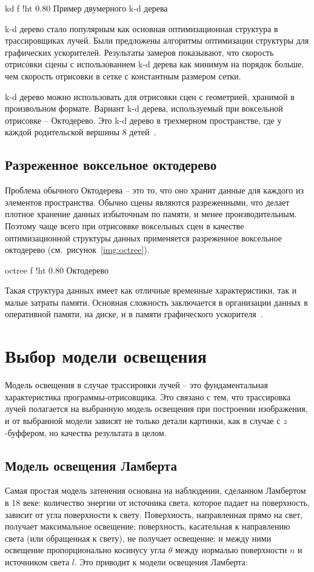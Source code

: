     {kd}
    {f}
    {!ht}
    {0.80\textwidth}
    {Пример двумерного k-d дерева}

k-d дерево стало популярным как основная оптимизационная структура в 
трассировщиках лучей. Были предложены алгоритмы оптимизации структуры для графических
ускорителей. Результаты замеров показывают, что скорость отрисовки сцены с использованием
k-d дерева как минимум на порядок больше, чем скорость отрисовки в сетке с константным 
размером сетки.

k-d дерево можно использовать для отрисовки сцен с геометрией, хранимой в произвольном 
формате. Вариант k-d дерева, используемый при воксельной отрисовке -- Октодерево. Это k-d дерево в трехмерном пространстве, где у каждой родительской вершины 8 детей~\cite{KDTASfaGR}.

\subsection{Разреженное воксельное октодерево}

Проблема обычного Октодерева -- это то, что оно хранит данные для каждого из элементов 
пространства. Обычно сцены являются разреженными, что делает плотное хранение данных
избыточным по памяти, и менее производительным. Поэтому чаще всего при отрисоввке
воксельных сцен в качестве оптимизационной структуры данных применяется разреженное воксельное
октодерево (см.~рисунок~\ref{img:octree}).

    {octree}
    {f}
    {!ht}
    {0.80\textwidth}
    {Октодерево}

Такая структура данных имеет как отличные временные характеристики, так и малые затраты памяти.
Основная сложность заключается в организации данных в оперативной памяти, на диске, 
и в памяти графического ускорителя~\cite{ESVOAEaI}.

\section{Выбор модели освещения}

Модель освещения в случае трассировки лучей -- это фундаментальная характеристика программы-отрисовщика. Это связано с тем, что трассировка лучей полагается на выбранную модель освещения
при построении изображения, и от выбранной модели зависят не только детали картинки, как в случае с $z$-буффером, но качества результата в целом.

\subsection{Модель освещения Ламберта}
Самая простая модель затенения основана на наблюдении, сделанном Ламбертом в 18 веке: 
количество энергии от источника света, которое падает на поверхность, зависит от угла 
поверхности к свету. Поверхность, направленная прямо на свет, получает максимальное 
освещение; поверхность, касательная к направлению света (или обращенная к свету), 
не получает освещение; и между ними освещение пропорционально косинусу угла $\theta$
между нормалью поверхности $n$ и источником света $l$. Это приводит к 
модели освещения Ламберта:

